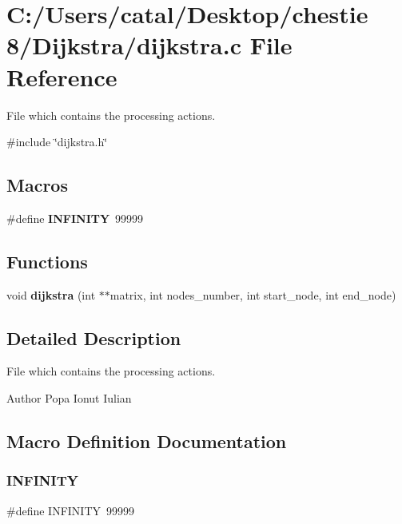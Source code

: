 \section{C\+:/\+Users/catal/\+Desktop/chestie 8/\+Dijkstra/dijkstra.c File Reference}
\label{dijkstra_8c}


File which contains the processing actions.  


{\ttfamily \#include \char`\"{}dijkstra.\+h\char`\"{}}\newline
\subsection*{Macros}
\begin{DoxyCompactItemize}
\item 
\#define \textbf{ I\+N\+F\+I\+N\+I\+TY}~99999
\end{DoxyCompactItemize}
\subsection*{Functions}
\begin{DoxyCompactItemize}
\item 
void \textbf{ dijkstra} (int $\ast$$\ast$matrix, int nodes\+\_\+number, int start\+\_\+node, int end\+\_\+node)
\end{DoxyCompactItemize}


\subsection{Detailed Description}
File which contains the processing actions. 

\begin{DoxyAuthor}{Author}
Popa Ionut Iulian 
\end{DoxyAuthor}


\subsection{Macro Definition Documentation}
\mbox{\label{dijkstra_8c_a956e2723d559858d08644ac99146e910}} 
\subsubsection{I\+N\+F\+I\+N\+I\+TY}
{\footnotesize\ttfamily \#define I\+N\+F\+I\+N\+I\+TY~99999}



